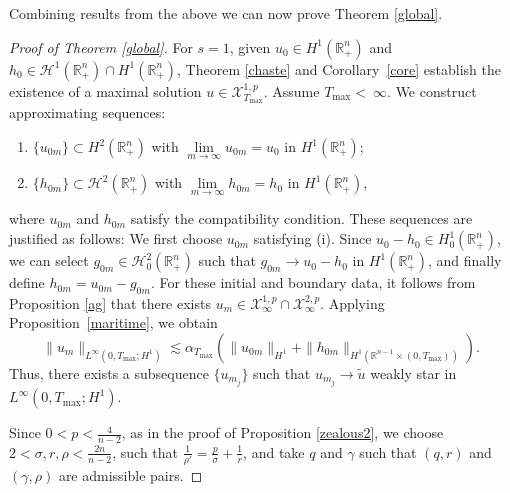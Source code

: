 \documentclass[preprint,compress,12pt]{elsarticle}
\numberwithin{equation}{section}
\begin{document}
Combining results from the above we can now prove Theorem \ref{global}.
\begin{proof}[Proof of Theorem \ref{global}]
	For $s=1$, given $u_0 \in H^1(\mathbb{R}_+^n)$ and $h_0 \in \mathcal{H}^1(\mathbb{R}^{n}_{+}) \cap H^1(\mathbb{R}^{n}_{+})$, Theorem \ref{chaste} and Corollary~\ref{core} establish the existence of a maximal solution $u \in \mathscr{X}^{1,p}_{T_{\max}}$.
	Assume $T_{\max}<~\infty$.
	We construct approximating sequences:
	\begin{enumerate}[label=(\roman*)]
		\item $\{u_{0m}\} \subset H^2(\mathbb{R}_+^n)$ with $\lim\limits_{m\to\infty} u_{0m} = u_0$ in $H^1(\mathbb{R}_+^n)$;
		\item $\{h_{0m}\} \subset \mathcal{H}^2(\mathbb{R}^{n}_{+})$ with $\lim\limits_{m\to\infty} h_{0m} = h_0$ in $H^1(\mathbb{R}^{n}_{+})$,
	\end{enumerate}
	where $u_{0m}$ and $h_{0m}$ satisfy the compatibility condition. These sequences are justified as follows: We first choose $u_{0m}$ satisfying (i). Since $u_{0}-h_{0}\in H_{0}^{1}(\mathbb{R}_{+}^{n})$, we can select $g_{0m}\in\mathcal{H}_{0}^{2}(\mathbb{R}_{+}^{n})$ such that $g_{0m}\rightarrow u_{0}-h_{0}$ in $H^{1}(\mathbb{R}_{+}^{n})$, and finally define $h_{0m}=u_{0m}-g_{0m}$. For these initial and boundary data, it follows from Proposition \ref{ag} that there exists
	$u_{m}\in \mathscr{X}^{1,p}_{\infty}\cap\mathscr{X}^{2,p}_{\infty}$. Applying Proposition~\ref{maritime}, we obtain
	\begin{equation}\label{cram}
		\|u_{m}\|_{L^{\infty}(0,T_{\max};H^{1})}\lesssim  \alpha_{T_{\max}} \left(\|u_{0m}\|_{H^{1}}+\|h_{0m}\|_{H^{1}(\mathbb{R}^{n-1}\times(0,T_{\max}))} \right).
	\end{equation}
	Thus, there exists a subsequence $\{u_{m_{j}}\}$ such that $u_{m_{j}}\rightarrow \tilde{u}$ weakly star in $L^{\infty}(0,T_{\max};H^{1})$.
	
	Since $0<p<\frac{4}{n-2}$, as in the proof of Proposition \ref{zealous2}, we choose $2<\sigma,r,\rho<\frac{2n}{n-2}$, such that $\frac{1}{\rho'}= \frac{p}{\sigma}+\frac{1}{r}$, and take $q$ and $\gamma$ such that $(q,r)$ and $(\gamma,\rho)$ are admissible pairs.
	

\end{proof}
\end{document}
